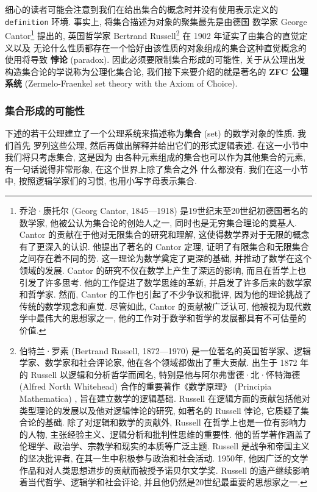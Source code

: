 \documentclass[10pt,UTF8]{book} %
\begin{document}
细心的读者可能会注意到我们在给出集合的概念时并没有使用表示定义的 \lstinline|definition|
环境. 事实上, 将集合描述为对象的聚集最先是由德国
数学家 George Cantor\footnote{
    乔治·康托尔 (Georg Cantor, 1845—1918) 是19世纪末至20世纪初德国著名的数学家, 他被公认为集合论的创始人之一, 同时也是无穷集合理论的奠基人.  Cantor 的贡献在于他对无限集合的研究和理解, 这使得数学界对于无限的概念有了更深入的认识. 他提出了著名的 Cantor 定理, 证明了有限集合和无限集合之间存在着不同的势. 这一理论为数学奠定了更深的基础, 并推动了数学在这个领域的发展.  Cantor 的研究不仅在数学上产生了深远的影响, 而且在哲学上也引发了许多思考. 他的工作促进了数学思维的革新, 并启发了许多后来的数学家和哲学家. 然而,  Cantor 的工作也引起了不少争议和批评, 因为他的理论挑战了传统的数学观念和直觉. 尽管如此,  Cantor 的贡献被广泛认可, 他被视为现代数学中最伟大的思想家之一, 他的工作对于数学和哲学的发展都具有不可估量的价值. 
} 提出的, 英国哲学家 Bertrand Russell\footnote{
    伯特兰·罗素 (Bertrand Russell, 1872—1970) 是一位著名的英国哲学家、逻辑学家、数学家和社会评论家, 
    他在各个领域都做出了重大贡献. 出生于 1872 年的 Russell 以逻辑和分析哲学而闻名, 特别是他与阿尔弗雷德·北·怀特海德 (Alfred North Whitehead) 合作的重要著作《数学原理》 (Principia Mathematica) , 旨在建立数学的逻辑基础.  Russell 在逻辑方面的贡献包括他对类型理论的发展以及他对逻辑悖论的研究, 如著名的 Russell 悖论, 它质疑了集合论的基础. 除了对逻辑和数学的贡献外,  Russell 在哲学上也是一位有影响力的人物, 主张经验主义、逻辑分析和批判性思维的重要性. 他的哲学著作涵盖了伦理学、政治学、宗教学和现实的本质等广泛主题.  Russell 是战争和帝国主义的坚决批评者, 在其一生中积极参与政治和社会活动. 1950年, 他因广泛的文学作品和对人类思想进步的贡献而被授予诺贝尔文学奖.  Russell 的遗产继续影响着当代哲学、逻辑学和社会评论, 并且他仍然是20世纪最重要的思想家之一. 
} 在 1902 年证实了由{\kaishu 集合的直觉定义}以及
{\kaishu 无论什么性质都存在一个恰好由该性质的对象组成的集合}这种直觉概念的使用将导致
\textbf{悖论} (paradox).
因此必须要限制集合形成的可能性, 关于从公理出发构造集合论的学说称为公理化集合论,
我们接下来要介绍的就是著名的 \textbf{ZFC 公理系统} (Zermelo-Fraenkel set theory with the Axiom of Choice).

\subsubsection{集合形成的可能性}

下述的若干公理建立了一个公理系统来描述称为\textbf{集合} (set) 的数学对象的性质. 我们首先
罗列这些公理, 然后再做出解释并给出它们的形式逻辑表述. 在这一小节中我们将只考虑集合, 这是因为
由各种元素组成的集合也可以作为其他集合的元素, 有一句话说得非常形象, {\kaishu 在这个世界上除了集合之外
什么都没有}. 我们在这一小节中, 按照逻辑学家们的习惯,
也用小写字母表示集合.
\end{document}
